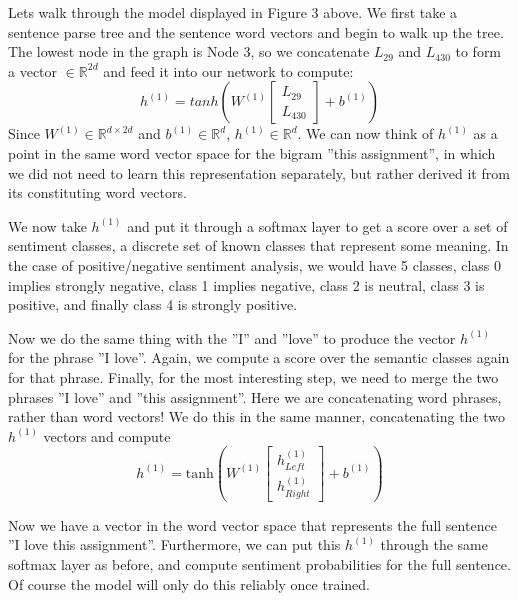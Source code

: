 \documentclass{tufte-handout}
\begin{document}
Lets walk through the model displayed in Figure 3 above. We first take a sentence parse tree and the sentence word vectors and begin to walk up the tree. The lowest node in the graph is Node 3, so we concatenate $L_{29}$ and $L_{430}$ to form a vector $\in \mathbb{R}^{2d}$ and feed it into our network to compute:
\begin{equation}
h^{(1)} = tanh(W^{(1)} \left[ \begin{array}{c} L_{29} \\ L_{430} \end{array} \right] + b^{(1)})
\end{equation}
Since $ W^{(1)} \in \mathbb{R}^{d \times 2d}$ and $ b^{(1)} \in \mathbb{R}^{d}$, $ h^{(1)} \in \mathbb{R}^{d}$. We can now think of $h^{(1)}$ as a point in the same word vector space for the bigram ''this assignment'', in which we did not need to learn this representation separately, but rather derived it from its constituting word vectors.

We now take $h^{(1)}$ and put it through a softmax layer to get a score over a set of sentiment classes, a discrete set of known classes that represent some meaning. In the case of positive/negative sentiment analysis, we would have 5 classes, class 0 implies strongly negative, class 1 implies negative, class 2 is neutral, class 3 is positive, and finally class 4 is strongly positive.

Now we do the same thing with the ''I'' and ''love'' to produce the vector $h^{(1)}$ for the phrase ''I love''. Again, we compute a score over the semantic classes again for that phrase. Finally, for the most interesting step, we need to merge the two phrases ''I love'' and ''this assignment''. Here we are concatenating word phrases, rather than word vectors! We do this in the same manner, concatenating the two $h^{(1)}$ vectors and compute
\begin{equation}
 h^{(1)} = \text{tanh}(W^{(1)}  \left[ \begin{array}{c} h^{(1)}_{Left} \\ h^{(1)}_{Right} \end{array} \right] + b^{(1)})
\end{equation}

Now we have a vector in the word vector space that represents the full sentence ''I love this assignment''. Furthermore, we can put this $h^{(1)}$ through the same softmax layer as before, and compute sentiment probabilities for the full sentence. Of course the model will only do this reliably once trained.
\end{document}
